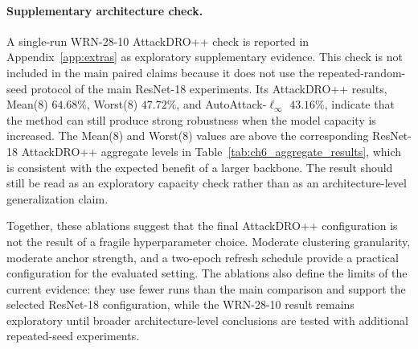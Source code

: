 \paragraph{Supplementary architecture check.}
A single-run WRN-28-10 AttackDRO++ check is reported in
Appendix~\ref{app:extras} as exploratory supplementary evidence. This check is
not included in the main paired claims because it does not use the
repeated-random-seed protocol of the main ResNet-18 experiments. Its
AttackDRO++ results, Mean(8) $64.68\%$, Worst(8) $47.72\%$, and
AutoAttack-$\ell_\infty$ $43.16\%$, indicate that the method can still produce
strong robustness when the model capacity is increased. The Mean(8) and
Worst(8) values are above the corresponding ResNet-18 AttackDRO++ aggregate
levels in Table~\ref{tab:ch6_aggregate_results}, which is consistent with the
expected benefit of a larger backbone. The result should still be read as an
exploratory capacity check rather than as an architecture-level generalization
claim.

Together, these ablations suggest that the final AttackDRO++ configuration is
not the result of a fragile hyperparameter choice. Moderate clustering
granularity, moderate anchor strength, and a two-epoch refresh schedule provide a
practical configuration for the evaluated setting. The ablations also define the
limits of the current evidence: they use fewer runs than the main comparison and
support the selected ResNet-18 configuration, while the WRN-28-10 result remains
exploratory until broader architecture-level conclusions are tested with
additional repeated-seed experiments.

